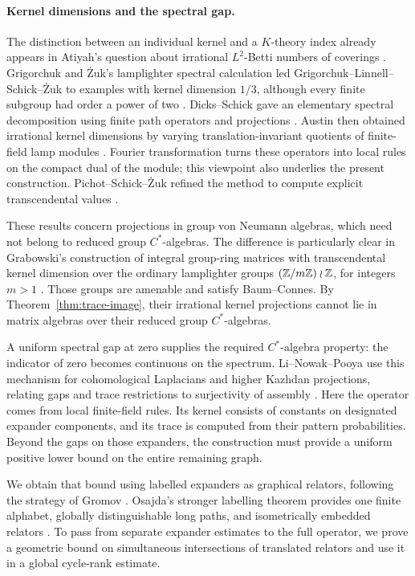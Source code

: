 \paragraph{Kernel dimensions and the spectral gap.}
The distinction between an individual kernel and a \(K\)-theory index
already appears in Atiyah's question about irrational
\(L^2\)-Betti numbers of coverings
\cite[Section~6.4, question~(iii)]{Atiyah1976}.
Grigorchuk and \.{Z}uk's lamplighter spectral calculation led
Grigorchuk--Linnell--Schick--\.{Z}uk to examples with kernel dimension
\(1/3\), although every finite subgroup had order a power of two
\cite{GLSZ2000}. Dicks--Schick gave an elementary spectral decomposition
using finite path operators and projections \cite{DicksSchick2002}.
Austin then obtained irrational kernel dimensions by varying
translation-invariant quotients of finite-field lamp modules
\cite[Theorem~1.1 and Corollary~1.2]{Austin2013}.
Fourier transformation turns these operators into local rules on the
compact dual of the module; this viewpoint also underlies the present
construction. Pichot--Schick--\.{Z}uk refined the method to compute
explicit transcendental values \cite{PichotSchickZuk2015}.

These results concern projections in group von Neumann algebras, which
need not belong to reduced group \(C^*\)-algebras. The difference is
particularly clear in Grabowski's construction of integral group-ring
matrices with transcendental kernel dimension over the ordinary
lamplighter groups \((\mathbb Z/m\mathbb Z)\wr\mathbb Z\), for integers \(m>1\)
\cite[Theorem~2]{Grabowski2016}. Those groups are amenable and satisfy
Baum--Connes. By Theorem~\ref{thm:trace-image}, their irrational kernel
projections cannot lie in matrix algebras over their reduced group
\(C^*\)-algebras.

A uniform spectral gap at zero supplies the required \(C^*\)-algebra
property: the indicator of zero becomes continuous on the spectrum.
Li--Nowak--Pooya use this mechanism for cohomological Laplacians and
higher Kazhdan projections, relating gaps and trace restrictions to
surjectivity of assembly \cite[Propositions~1,~5 and~7]{LiNowakPooya2024}.
Here the operator comes from local finite-field rules. Its kernel
consists of constants on designated expander components, and its trace
is computed from their pattern probabilities. Beyond the gaps on those
expanders, the construction must provide a uniform positive lower bound
on the entire remaining graph.

We obtain that bound using labelled expanders as graphical relators,
following the strategy of Gromov \cite{Gromov2003}. Osajda's stronger
labelling theorem provides one finite alphabet, globally distinguishable
long paths, and isometrically embedded relators
\cite[Theorems~2.7 and~3.2]{Osajda2020}. To pass from separate
expander estimates to the full operator, we prove a geometric bound on
simultaneous intersections of translated relators and use it in a
global cycle-rank estimate.

